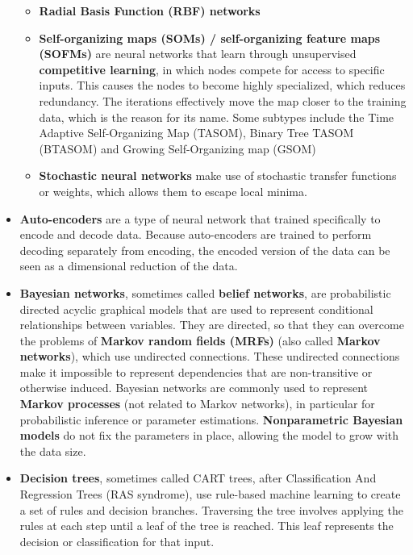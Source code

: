 \begin{itemize}
\begin{itemize}
			\item \textbf{Radial Basis Function (RBF) networks}
				\cite{rbf}
			\item \textbf{Self-organizing maps (SOMs) / self-organizing feature maps (SOFMs)}
				are neural networks that learn through unsupervised \textbf{competitive learning}, in which nodes compete for access to specific inputs. This causes the nodes to become highly specialized, which reduces redundancy. The iterations effectively move the map closer to the training data, which is the reason for its name. Some subtypes include the Time Adaptive Self-Organizing Map (TASOM), Binary Tree TASOM (BTASOM) and Growing Self-Organizing map (GSOM)
			\item \textbf{Stochastic neural networks}
				make use of stochastic transfer functions or weights, which allows them to escape local minima. 
		\end{itemize}
	\item \textbf{Auto-encoders}
		are a type of neural network that trained specifically to encode and decode data. Because auto-encoders are trained to perform decoding separately from encoding, the encoded version of the data can be seen as a dimensional reduction of the data.
	\item \textbf{Bayesian networks}, 
		sometimes called \textbf{belief networks}, are probabilistic directed acyclic graphical models\cite{Wain08}\cite{Kol09}\cite{Xin16} that are used to represent conditional relationships between variables. They are directed, so that they can overcome the problems of \textbf{Markov random
		fields (MRFs)} (also called \textbf{Markov networks}), which use undirected connections. These undirected connections make it impossible to represent dependencies that are non-transitive or otherwise induced. Bayesian networks are commonly used to represent \textbf{Markov processes} (not related to Markov networks), in particular for probabilistic inference or parameter estimations.
		\textbf{Nonparametric Bayesian models}\cite{Grif05}\cite{Teh06} do not fix the parameters in place, allowing the model to grow with the data size.
	\item \textbf{Decision trees},
		sometimes called CART trees, after Classification And Regression Trees (RAS syndrome), use rule-based machine learning to create a set of rules and decision branches. Traversing the tree involves applying the rules at each step until a leaf of the tree is reached. This leaf represents the decision or classification for that input.

\end{itemize}
